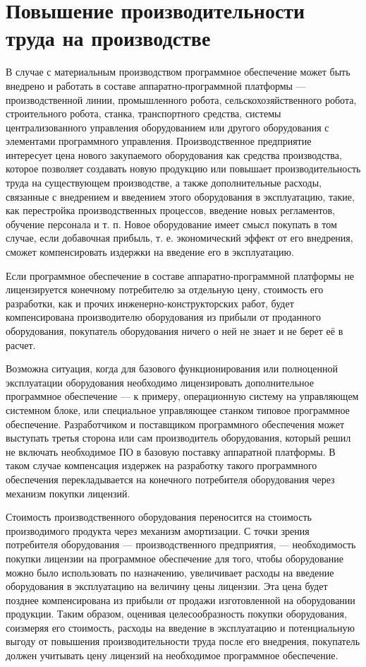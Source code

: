 \documentclass{article}
\begin{document}
\section*{Повышение производительности труда на производстве}

В случае с материальным производством программное обеспечение может быть внедрено и работать в составе аппаратно-программной платформы — производственной линии, промышленного робота, сельскохозяйственного робота, строительного робота, станка, транспортного средства, системы централизованного управления оборудованием или другого оборудования с элементами программного управления. Производственное предприятие интересует цена нового закупаемого оборудования как средства производства, которое позволяет создавать новую продукцию или повышает производительность труда на существующем производстве, а также дополнительные расходы, связанные с внедрением и введением этого оборудования в эксплуатацию, такие, как перестройка производственных процессов, введение новых регламентов, обучение персонала и т. п. Новое оборудование имеет смысл покупать в том случае, если добавочная прибыль, т. е. экономический эффект от его внедрения, сможет компенсировать издержки на введение его в эксплуатацию.

Если программное обеспечение в составе аппаратно-программной платформы не лицензируется конечному потребителю за отдельную цену, стоимость его разработки, как и прочих инженерно-конструкторских работ, будет компенсирована производителю оборудования из прибыли от проданного оборудования, покупатель оборудования ничего о ней не знает и не берет её в расчет.

Возможна ситуация, когда для базового функционирования или полноценной эксплуатации оборудования необходимо лицензировать дополнительное программное обеспечение — к примеру, операционную систему на управляющем системном блоке, или специальное управляющее станком типовое программное обеспечение. Разработчиком и поставщиком программного обеспечения может выступать третья сторона или сам производитель оборудования, который решил не включать необходимое ПО в базовую поставку аппаратной платформы. В таком случае компенсация издержек на разработку такого программного обеспечения перекладывается на конечного потребителя оборудования через механизм покупки лицензий.

Стоимость производственного оборудования переносится на стоимость производимого продукта через механизм амортизации. С точки зрения потребителя оборудования — производственного предприятия, — необходимость покупки лицензии на программное обеспечение для того, чтобы оборудование можно было использовать по назначению, увеличивает расходы на введение оборудования в эксплуатацию на величину цены лицензии. Эта цена будет позднее компенсирована из прибыли от продажи изготовленной на оборудовании продукции. Таким образом, оценивая целесообразность покупки оборудования, соизмеряя его стоимость, расходы на введение в эксплуатацию и потенциальную выгоду от повышения производительности труда после его внедрения, покупатель должен учитывать цену лицензий на необходимое программное обеспечение.
\end{document}
